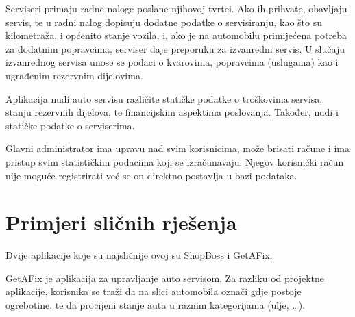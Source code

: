 		Serviseri primaju radne naloge poslane njihovoj tvrtci. Ako ih prihvate, obavljaju servis, te u radni nalog dopisuju dodatne podatke o servisiranju, kao što su kilometraža, i općenito stanje vozila, i, ako je na automobilu primijećena potreba za dodatnim popravcima, serviser daje preporuku za izvanredni servis. U slučaju izvanrednog servisa unose se podaci o kvarovima, popravcima (uslugama) kao i ugrađenim rezervnim dijelovima.

		Aplikacija nudi auto servisu različite statičke podatke o troškovima servisa, stanju rezervnih dijelova, te financijskim aspektima poslovanja. Također, nudi i statičke podatke o serviserima.
		
		Glavni administrator ima upravu nad svim korisnicima, može brisati račune i ima pristup svim statističkim podacima koji se izračunavaju. Njegov korisnički račun nije moguće registrirati već se on direktno postavlja u bazi podataka.
		
		\section{Primjeri sličnih rješenja}
		
		\normalsize Dvije aplikacije koje su najsličnije ovoj su ShopBoss i GetAFix. 
		
		GetAFix je aplikacija za upravljanje auto servisom. Za razliku od projektne aplikacije, korisnika se traži da na slici automobila označi gdje postoje ogrebotine, te da procijeni stanje auta u raznim kategorijama (ulje, \ldots).
		
